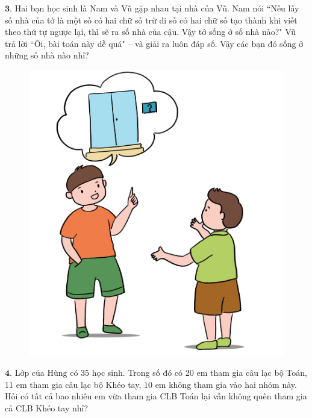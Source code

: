 \begin{multicols}{2}
\begin{figure}[H]
			\vspace*{-15pt}
		\end{figure}
	$\pmb{3.}$ Hai bạn học sinh là Nam và Vũ gặp nhau tại nhà của Vũ. Nam nói ``Nếu lấy số nhà của tớ là một số có hai chữ số trừ đi số có hai chữ số tạo thành khi viết theo thứ tự ngược lại, thì sẽ ra số nhà của cậu. Vậy tớ sống ở số nhà nào?"
	\vskip 0.1cm
	Vũ trả lời ``Ôi, bài toán này dễ quá" -- và giải ra luôn đáp số.
	\vskip 0.1cm
	Vậy các bạn đó sống ở những số nhà nào nhỉ?
	\begin{figure}[H]
			\centering
			\vspace*{-5pt}
			\captionsetup{labelformat= empty, justification=centering}
			\includegraphics[width=0.7\linewidth]{Pi10_ToanBi_Bai3}
			\vspace*{-15pt}
		\end{figure}
	$\pmb{4.}$ Lớp của Hùng có $35$ học sinh. Trong số đó có $20$ em tham gia câu lạc bộ Toán, 11 em tham gia câu lạc bộ Khéo tay, $10$ em không tham gia vào hai nhóm này. Hỏi có tất cả bao nhiêu em vừa tham gia CLB Toán lại vẫn không quên tham gia cả CLB Khéo tay nhỉ?
	\begin{figure}[H]
			\centering
			\vspace*{-5pt}
			\captionsetup{labelformat= empty, justification=centering}

\end{figure}
\end{multicols}

